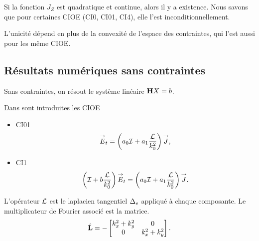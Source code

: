       Si la fonction \(J_Z\) est quadratique et continue, alors il y a existence.
      Nous savons que pour certaines CIOE (CI0, CI01, CI4), elle l'est inconditionnellement.

      L'unicité dépend en plus de la convexité de l'espace des contraintes, qui l'est aussi pour les même CIOE.


  \subsection{Résultats numériques sans contraintes}

      Sans contraintes, on résout le système linéaire \(\mathbf{H} X = b\). 

      Dans \cite{stupfel_implementation_2015} sont introduites les CIOE
      \begin{itemize}
        \item CI01
          \begin{equation*}
            {\overset{\rightarrow}{E}}_t = \left(a_0{\mathcal{I}} + a_1\dfrac{\mathcal{L}}{k_0^2}\right){\overset{\rightarrow}{J}},
          \end{equation*}
        \item CI1
          \begin{equation*}
            \left({\mathcal{I}} + b\dfrac{\mathcal{L}}{k_0^2} \right){\overset{\rightarrow}{E}}_t = \left(a_0{\mathcal{I}} + a_1\dfrac{\mathcal{L}}{k_0^2}\right){\overset{\rightarrow}{J}}.
          \end{equation*}
      \end{itemize}

      L'opérateur \(\mathcal{L}\) est le laplacien tangentiel \(\Delta_s\) appliqué à chaque composante. Le multiplicateur de Fourier associé est la matrice.
      \begin{equation*}
        \hat{\mathbf{L}}  = -
        \begin{bmatrix}
          k_x^2 + k_y^2 & 0
          \\
          0 & k_x^2 + k_y^2
        \end{bmatrix}.
      \end{equation*}

